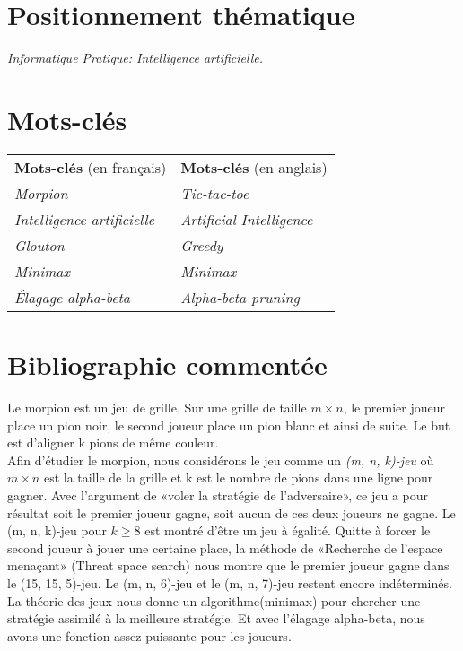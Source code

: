 \documentclass[12pt,a4paper]{article}
\begin{document}
\flushleft
\section*{\bfseries Positionnement thématique}

\hspace*{7mm}\textit{Informatique Pratique: Intelligence artificielle.}

\section*{\bfseries Mots-clés}

\begin{tabular}{l l}
    {\bfseries Mots-clés} (en français) & {\bfseries Mots-clés} (en anglais)\\
    \textit{Morpion}& \textit{Tic-tac-toe}\\
    \textit{Intelligence artificielle} & \textit{Artificial Intelligence}\\
    \textit{Glouton} & \textit{Greedy}\\
    \textit{Minimax} & \textit{Minimax}\\
    \textit{Élagage alpha-beta} & \textit{Alpha-beta pruning}
\end{tabular}

\section*{\bfseries Bibliographie commentée}

\hspace*{7mm}Le morpion est un jeu de grille. Sur une grille de taille $m \times n$, le premier joueur place un pion noir, le second joueur place un pion blanc et ainsi de suite. Le but est d'aligner k pions de même couleur.\\
\hspace*{7mm}Afin d'étudier le morpion, nous considérons le jeu comme un \textit{(m, n, k)-jeu} où $m\times n$ est la taille de la grille et k est le nombre de pions dans une ligne pour gagner. Avec l'argument de «voler la stratégie de l'adversaire», ce jeu a pour résultat soit le premier joueur gagne, soit aucun de ces deux joueurs ne gagne\cite{steal}. Le (m, n, k)-jeu pour $k\ge 8$ est montré d'être un jeu à égalité\cite{9-win, 8-win}. Quitte à forcer le second joueur à jouer une certaine place, la méthode de «Recherche de l'espace menaçant» (Threat space search) nous montre que le premier joueur gagne dans le (15, 15, 5)-jeu.\cite{Threat} Le (m, n, 6)-jeu et le (m, n, 7)-jeu restent encore indéterminés\cite{67-win}. La théorie des jeux nous donne un algorithme(minimax) pour chercher une stratégie assimilé à la meilleure stratégie\cite{minimax}. Et avec l'élagage alpha-beta, nous avons une fonction assez puissante pour les joueurs\cite{alpha-beta}.  
\newpage 
\end{document}
